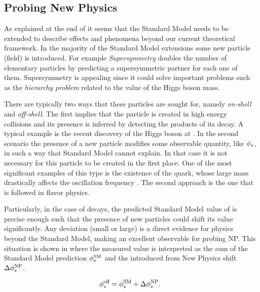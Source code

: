 \subsection{Probing New Physics}
\label{probe_new_phys}

As explained at the end of  it seems that the Standard Model needs to be extended
to describe effects and phenomena beyond our current theoretical framework. In the majority of the Standard Model
extensions some new particle (field) is introduced. For example {\it Supersymmetry} \cite{Golfand:1971iw,Volkov:1973ix,Wess:1974tw}
doubles the number of elementary particles by predicting a supersymmetric partner for each one of them.
Supersymmetry is appealing since it could solve important problems such as the {\it hierarchy problem}
related to the value of the Higgs boson mass.

There are typically two ways that these particles are sought for, namely {\it on-shell} and {\it off-shell}.
The first implies that the particle is created in high energy collisions and its presence is inferred by detecting the products of
its decay. A typical example is the recent discovery of the Higgs boson at \lhc \cite{higgs-cms,higgs-atlas}.
In the second scenario the presence of a new particle modifies some observable quantity, like $\phi_{s}$, in such a way that Standard Model
cannot explain. In that case it is not necessary for this particle to be created in the first place.
One of the most significant examples of this type is the existence of the \tquark quark, whose large mass
drastically affects the \BdBdbarSyst oscillation frequency \cite{argus-bbmix}. The second approach is the one
that is followed in flavor physics.

Particularly, in the case of \BsJpsiPhi decays, the predicted Standard Model value of  is precise enough
such that the presence of new particles could shift its value \cite{Buras:2009if,Chiang:2009ev,Datta:2009fk} significantly.
Any deviation (small or large) is a direct evidence for physics beyond the Standard Model, making \phis an excellent observable for probing NP.
This situation is shown in  where the measured value  is interpreted
as the sum of the Standard Model prediction $\phi_{s}^{\tiny\text{SM}}$ and the introduced from New Physics shift $\Delta\phi_{s}^{\tiny\text{NP}}$.

\begin{equation}
  \centering
 \phis^{\text {eff}} = \phis^{\tiny \text{SM}} + \Delta\phiS{NP}.
 \label{phis_meas}
\end{equation}

